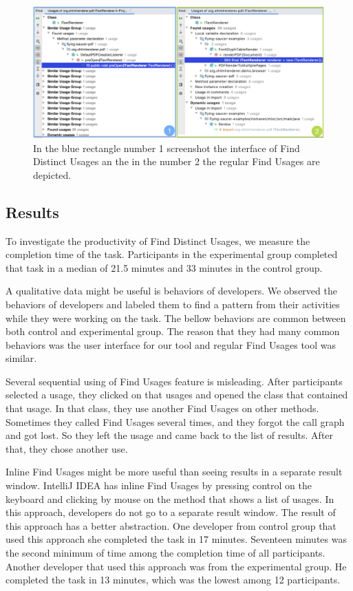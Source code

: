 \documentclass[conference]{IEEEtran}
\begin{document}
\begin{figure}[h]
    \centering
    \includegraphics [width=\textwidth,keepaspectratio,clip]{figures/compare}
    \caption{In the blue rectangle number 1 screenshot the interface of Find Distinct Usages an the in the number 2 the regular Find Usages are depicted. }
\label{fig:compare}
\end{figure}

\subsection{Results}
To investigate the productivity of Find Distinct Usages, we measure the completion time of the task. Participants in the experimental group completed that task in a median of 21.5 minutes and 33 minutes in the control group. \par

A qualitative data might be useful is behaviors of developers. We observed the behaviors of developers and labeled them to find a pattern from their activities while they were working on the task. The bellow behaviors are common between both control and experimental group. The reason that they had many common behaviors was the user interface for our tool and regular Find Usages tool was similar. \par

Several sequential using of Find Usages feature is misleading. After participants selected a usage, they clicked on that usages and opened the class that contained that usage. In that class, they use another Find Usages on other methods. Sometimes they called Find Usages several times, and they forgot the call graph and got lost. So they left the usage and came back to the list of results. After that, they chose another use. \par

Inline Find Usages might be more useful than seeing results in a separate result window. IntelliJ IDEA has inline Find Usages by pressing control on the keyboard and clicking by mouse on the method that shows a list of usages. In this approach, developers do not go to a separate result window. The result of this approach has a better abstraction. One developer from control group that used this approach she completed the task in 17 minutes. Seventeen minutes was the second minimum of time among the completion time of all participants. Another developer that used this approach was from the experimental group. He completed the task in 13 minutes, which was the lowest among 12 participants. \par
\end{document}
